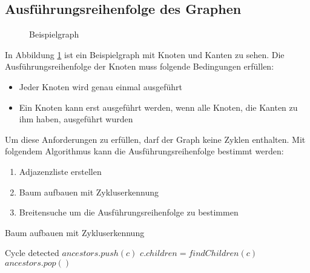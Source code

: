 \subsection{Ausführungsreihenfolge des Graphen}

\begin{figure}[H]
    \centering
    \caption{Beispielgraph}
    \label{fig:nodeExecutionOrder1}
\end{figure}

In Abbildung \ref{fig:nodeExecutionOrder1} ist ein Beispielgraph mit Knoten und Kanten zu sehen. Die Ausführungsreihenfolge der Knoten muss folgende Bedingungen erfüllen:
\begin{itemize}
    \item Jeder Knoten wird genau einmal ausgeführt
    \item Ein Knoten kann erst ausgeführt werden, wenn alle Knoten, die Kanten zu ihm haben, ausgeführt wurden
\end{itemize}

Um diese Anforderungen zu erfüllen, darf der Graph keine Zyklen enthalten. Mit folgendem Algorithmus kann die Ausführungsreihenfolge bestimmt werden:
\begin{enumerate}
    \item Adjazenzliste erstellen
    \item Baum aufbauen mit Zykluserkennung
    \item Breitensuche um die Ausführungsreihenfolge zu bestimmen 
\end{enumerate}

\begin{algorithm}[H]
    \caption{Baum aufbauen mit Zykluserkennung}
    \begin{algorithmic}[1]
                    \State Cycle detected
                \EndIf
                \State $ancestors.push(c)$
                \State $c.children = findChildren(c)$
                \State {}
                \State $ancestors.pop()$
            \EndFor
        \EndFunction
    \end{algorithmic}
\end{algorithm}

